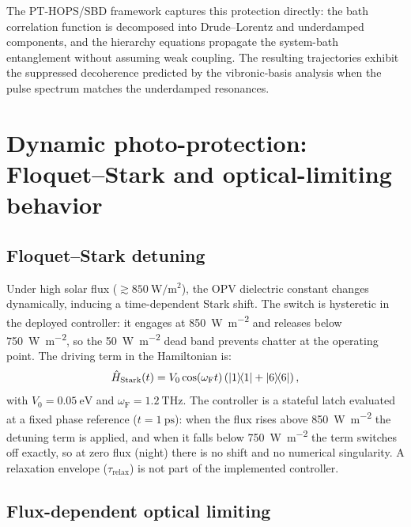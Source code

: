 \documentclass[11pt,a4paper]{article}
\begin{document}
The PT-HOPS/SBD framework captures this protection directly: the bath correlation function is decomposed into Drude--Lorentz and underdamped components, and the hierarchy equations propagate the system-bath entanglement without assuming weak coupling. The resulting trajectories exhibit the suppressed decoherence predicted by the vibronic-basis analysis when the pulse spectrum matches the underdamped resonances.


\section{Dynamic photo-protection: Floquet--Stark and optical-limiting behavior}
\label{SI-sec:npq}\label{SI-sec:floquet}

\subsection{Floquet--Stark detuning}

Under high solar flux ($\gtrsim \qty{850}{\W\per\m\squared}$), the OPV dielectric constant changes dynamically, inducing a time-dependent Stark shift. The switch is hysteretic in the deployed controller: it engages at \qty{850}{\W\per\m\squared} and releases below \qty{750}{\W\per\m\squared}, so the \qty{50}{\W\per\m\squared} dead band prevents chatter at the operating point. The driving term in the Hamiltonian is:
\begin{equation}\label{eq:SI_stark_detuning}
\hat{H}_{\mathrm{Stark}}(t) = V_0 \cos(\omega_{\mathrm{F}} t) \left( \dyad{1}{1} + \dyad{6}{6} \right),
\end{equation}
with $V_0 = \qty{0.05}{\eV}$ and $\omega_{\mathrm{F}} = \qty{1.2}{\THz}$.
The controller is a stateful latch evaluated at a fixed phase reference ($t = \qty{1}{\ps}$): when the flux rises above \qty{850}{\W\per\m\squared} the detuning term is applied, and when it falls below \qty{750}{\W\per\m\squared} the term switches off exactly, so at zero flux (night) there is no shift and no numerical singularity. A relaxation envelope ($\tau_{\mathrm{relax}}$) is not part of the implemented controller.

\subsection{Flux-dependent optical limiting}
\end{document}
